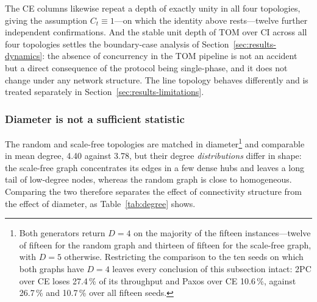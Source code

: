 \documentclass[journal]{IEEEtran}
\newcommand{\CI}{CI}                      %
\newcommand{\CE}{CE}                      %
\newcommand{\Diam}{D}                     %
\begin{document}
The \CE{} columns likewise repeat a depth of exactly unity in all four
topologies, giving the assumption $C_t \equiv 1$---on which the identity
above rests---twelve further independent confirmations. And the stable
unit depth of TOM over \CI{} across all four topologies settles the
boundary-case analysis of Section~\ref{sec:results-dynamics}: the absence
of concurrency in the TOM pipeline is not an accident but a direct
consequence of the protocol being single-phase, and it does not change
under any network structure. The line topology behaves differently and is
treated separately in Section~\ref{sec:results-limitations}.

\subsubsection{Diameter is not a sufficient statistic}

The random and scale-free topologies are matched in
diameter\footnote{Both generators return $\Diam = 4$ on the majority of the
fifteen instances---twelve of fifteen for the random graph and thirteen of
fifteen for the scale-free graph, with $\Diam = 5$ otherwise. Restricting the
comparison to the ten seeds on which both graphs have $\Diam = 4$ leaves every
conclusion of this subsection intact: 2PC over \CE{} loses 27.4\,\% of its
throughput and Paxos over \CE{} 10.6\,\%, against 26.7\,\% and 10.7\,\% over
all fifteen seeds.} and comparable in mean degree, 4.40 against 3.78, but
their degree \emph{distributions} differ in shape: the scale-free graph
concentrates its edges in a few dense hubs and leaves a long tail of
low-degree nodes, whereas the random graph is close to homogeneous. Comparing
the two therefore separates the effect of connectivity structure from the
effect of diameter, as Table~\ref{tab:degree} shows.
\end{document}
